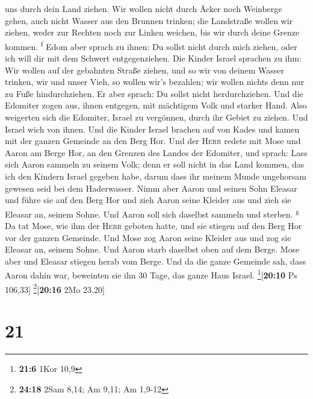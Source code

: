 uns durch dein Land ziehen. Wir wollen nicht durch Äcker noch Weinberge
gehen, auch nicht Wasser aus den Brunnen trinken; die Landstraße wollen
wir ziehen, weder zur Rechten noch zur Linken weichen, bis wir durch
deine Grenze kommen. \textsuperscript{f}  Edom aber
sprach zu ihnen: Du sollst nicht durch mich ziehen, oder ich will dir
mit dem Schwert entgegenziehen.  Die Kinder Israel
sprachen zu ihm: Wir wollen auf der gebahnten Straße ziehen, und so wir
von deinem Wasser trinken, wir und unser Vieh, so wollen wir's bezahlen;
wir wollen nichts denn nur zu Fuße hindurchziehen.  Er
aber sprach: Du sollst nicht herdurchziehen. Und die Edomiter zogen aus,
ihnen entgegen, mit mächtigem Volk und starker Hand. 
Also weigerten sich die Edomiter, Israel zu vergönnen, durch ihr Gebiet
zu ziehen. Und Israel wich von ihnen.  Und die Kinder
Israel brachen auf von Kades und kamen mit der ganzen Gemeinde an den
Berg Hor.  Und der \textsc{Herr} redete mit Mose und
Aaron am Berge Hor, an den Grenzen des Landes der Edomiter, und sprach:
 Lass sich Aaron sammeln zu seinem Volk; denn er soll
nicht in das Land kommen, das ich den Kindern Israel gegeben habe, darum
dass ihr meinem Munde ungehorsam gewesen seid bei dem Haderwasser.
 Nimm aber Aaron und seinen Sohn Eleasar und führe sie
auf den Berg Hor  und zieh Aaron seine Kleider aus und
zieh sie Eleasar an, seinem Sohne. Und Aaron soll sich daselbst sammeln
und sterben. \textsuperscript{g}  Da tat Mose, wie ihm
der \textsc{Herr} geboten hatte, und sie stiegen auf den Berg Hor vor
der ganzen Gemeinde.  Und Mose zog Aaron seine Kleider
aus und zog sie Eleasar an, seinem Sohne. Und Aaron starb daselbst oben
auf dem Berge. Mose aber und Eleasar stiegen herab vom Berge.
 Und da die ganze Gemeinde sah, dass Aaron dahin war,
beweinten sie ihn 30 Tage, das ganze Haus Israel.
\footnote{\textbf{21:6} 1Kor 10,9}{[}\textbf{20:10} Ps 106,33{]}
\footnote{\textbf{24:18} 2Sam 8,14; Am 9,11; Am 1,9-12}{[}\textbf{20:16}
2Mo 23,20{]}

\hypertarget{section-20}{%
\section{21}\label{section-20}}

